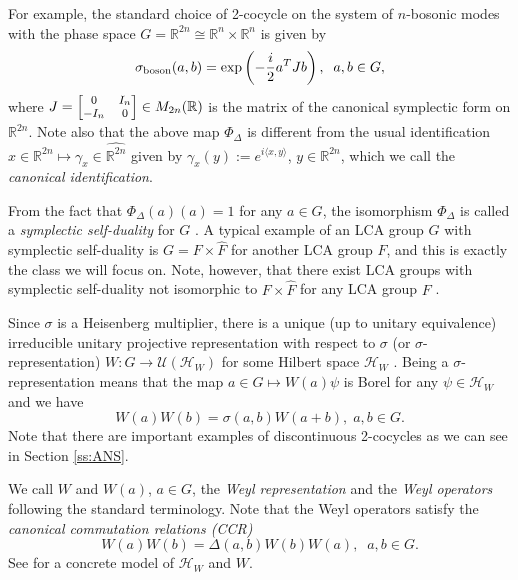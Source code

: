 \documentclass[12pt,reqno]{amsart}
\theoremstyle{definition}
\theoremstyle{definition}
\theoremstyle{definition}
\numberwithin{thm}{section}
\numberwithin{equation}{section}
\newcommand{\Real}{\mathbb R}
\newcommand{\la}{\langle}
\newcommand{\ra}{\rangle}
\newcommand{\Hi}{\mathcal{H}}
\newcommand{\tcr}[1]{\textcolor{red}{#1}}
\begin{document}
For example, the standard choice of 2-cocycle on the system of $n$-bosonic modes with the phase space $G = \mathbb R^{2n} \cong \Real^n\times \Real^n$ is given by
    \begin{equation}\label{eq-Euclid-2-cocycle}
    \sigma_{\rm boson}( a ,  b ) =  \exp\left(-\frac{i}{2} a ^T J  b \right), \;\; a ,  b  \in G, 
    \end{equation}
where $J={\footnotesize \begin{bmatrix}0 & I_n\\ -I_n & 0\end{bmatrix}}\in M_{2n}(\Real)$ is the matrix of the canonical symplectic form on $\Real^{2n}$. 
Note also that the above map $\Phi_\Delta$ is different from the usual identification $x \in \Real^{2n}\mapsto \gamma_x \in \widehat{\Real^{2n}}$ given by $\gamma_x(y):=e^{i \la x, y\ra}$, $y \in \Real^{2n}$, %
which we call the {\em canonical identification}.

From the fact that $\Phi_\Delta(a)(a) = 1$ for any $a\in G$, the isomorphism $\Phi_\Delta$ is called a {\em symplectic self-duality} for $G$ \cite{PrasadShapiroVemuri10}. A typical example of an LCA group $G$ with symplectic self-duality is $G=F\times \widehat{F}$ for another LCA group $F$, and this is exactly the class we will focus on. Note, however, that there exist LCA groups with symplectic self-duality not isomorphic to $F\times \widehat{F}$ for any LCA group $F$ \cite[Theorem 11.2]{PrasadShapiroVemuri10}.

Since $\sigma$ is a Heisenberg multiplier, there is a unique (up to unitary equivalence) irreducible unitary projective representation with respect to $\sigma$ (or $\sigma$-representation) $W: G\to \mathcal{U}(\Hi_W)$ for some Hilbert space $\Hi_W$ \cite[Theorem 2]{DigernesVaradarajan04}. Being a $\sigma$-representation means that the map $a\in G \mapsto W(a)\psi$ is Borel for any $\psi\in \Hi_W$ and we have
    \begin{equation}\label{eq-proj-rep}
    W(a)W(b) = \sigma(a,b)W(a+b),\; a,b \in G.
    \end{equation}
Note that there are important examples of discontinuous 2-cocycles as we can see in Section \ref{ss:ANS}.

We call $W$ and $W(a)$, $a\in G$, the {\em Weyl representation} and the {\em Weyl operators} following the standard terminology. Note that the Weyl operators satisfy the {\em canonical commutation relations (CCR)}
    \begin{equation} \label{eq-Weyl-CCR}
        W(a) W(b) =  \Delta(a,b)W(b)W(a),\;\;  a ,  b \in G.
    \end{equation}
See \cite[\S 3.5]{DigernesVaradarajan04} for a concrete model of $\Hi_W$ and $W$.
\end{document}
